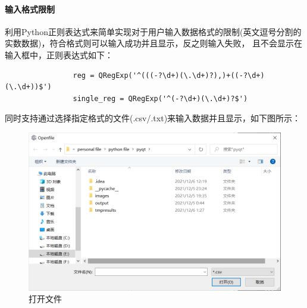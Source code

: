 \documentclass[UTF8]{ctexart}
\begin{document}
            \paragraph{输入格式限制}
            利用Python正则表达式来简单实现对于用户输入数据格式的限制(英文逗号分割的实数数据)，符合格式则可以输入成功并且显示，反之则输入失败，
            且不会显示在输入框中，正则表达式如下：
            \begin{verbatim}
                reg = QRegExp('^(((-?\d+)(\.\d+)?),)+((-?\d+)(\.\d+))$')
                single_reg = QRegExp('^(-?\d+)(\.\d+)?$')
            \end{verbatim}
            同时支持通过选择指定格式的文件(.csv/.txt)来输入数据并且显示，如下图所示：
            \begin{figure}[htb]
                \centering
                \includegraphics[scale = 0.4]{openfile.png}
                \caption{打开文件}
                \label{fig:openfile}
            \end{figure}
\end{document}
